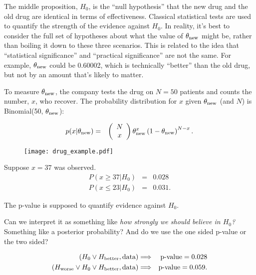 \documentclass[a4paper, 12pt]{article}
\begin{document}
The middle proposition, $H_0$,
is the ``null hypothesis'' that the new drug and the
old drug are identical in terms of effectiveness. Classical statistical tests
are used to quantify the strength of the evidence against $H_0$. In reality,
it's best to consider the full set of hypotheses about what the value of
$\theta_{\rm new}$ might be, rather than boiling it down to these three
scenarios. This is related to the idea
that ``statistical significance'' and ``practical significance'' are not the
same. For example, $\theta_{\rm new}$ could be 0.60002, which is
technically ``better'' than the old drug, but not by an amount that's likely
to matter.

To measure $\theta_{\rm new}$, the company tests the drug on $N=50$ patients
and counts the number, $x$, who recover. The probability distribution for
$x$ given $\theta_{\rm new}$ (and $N$) is Binomial(50, $\theta_{\rm new}$):

\begin{eqnarray}
p(x | \theta_{\rm new}) &=&
\left(\begin{array}{cc}N \\ x\end{array}\right)
\theta_{\rm new}^x \left(1 - \theta_{\rm new}\right)^{N - x}.
\end{eqnarray}

\begin{figure}[ht!]
\centering
\texttt{[image: drug\_example.pdf]}
\caption{\label{fig:drug_example}}
\end{figure}

Suppose $x=37$ was observed.
\begin{eqnarray}
P(x \geq 37 | H_0) &=& 0.028\\
P(x \leq 23 | H_0) &=& 0.031.
\end{eqnarray}

The p-value is supposed to quantify evidence against $H_0$.

Can we interpret it as something like {\em how strongly we should believe in
$H_0$?} Something like a posterior probability?
And do we use the one sided p-value or the two sided?

\begin{eqnarray}
\left(H_0 \vee H_{\rm better}, \textnormal{data}\right) &\Longrightarrow&
\textnormal{p-value} = 0.028\\
\left(H_{\rm worse} \vee H_0 \vee H_{\rm better}, \textnormal{data}\right) &\Longrightarrow&
\textnormal{p-value} = 0.059.
\end{eqnarray}
\end{document}
